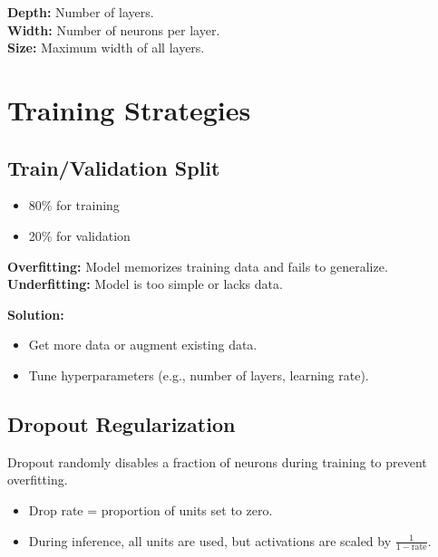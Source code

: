 \textbf{Depth:} Number of layers.\\
\textbf{Width:} Number of neurons per layer.\\
\textbf{Size:} Maximum width of all layers.

\section{Training Strategies}

\subsection*{Train/Validation Split}

\begin{itemize}
    \item 80\% for training
    \item 20\% for validation
\end{itemize}

\textbf{Overfitting:} Model memorizes training data and fails to generalize.\\
\textbf{Underfitting:} Model is too simple or lacks data.

\textbf{Solution:}
\begin{itemize}
    \item Get more data or augment existing data.
    \item Tune hyperparameters (e.g., number of layers, learning rate).
\end{itemize}

\subsection*{Dropout Regularization}

Dropout randomly disables a fraction of neurons during training to prevent overfitting.

\begin{itemize}
    \item Drop rate = proportion of units set to zero.
    \item During inference, all units are used, but activations are scaled by $\frac{1}{1 - \text{rate}}$.
\end{itemize}

\begin{center}
\end{center}